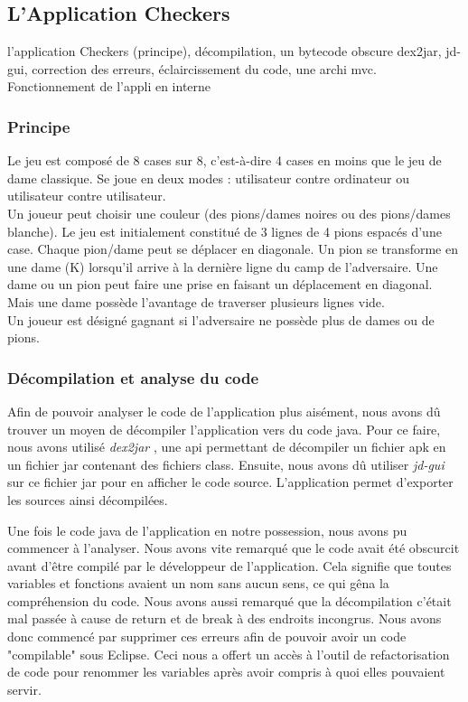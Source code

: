 
\subsection{L'Application Checkers}

l'application Checkers (principe), décompilation, un bytecode obscure
dex2jar, jd-gui, correction des erreurs, éclaircissement du code, une archi mvc.
Fonctionnement de l'appli en interne
\subsubsection{Principe}
\begin{figure}[hp]
	      \begin{center}
	      \end{center}
\end{figure}
Le jeu est composé de 8 cases sur 8, c’est-à-dire 4 cases en moins que le jeu de dame classique.  Se joue en deux modes : utilisateur contre ordinateur ou utilisateur contre utilisateur.\\
Un joueur peut choisir une couleur (des pions/dames noires ou des pions/dames blanche).  Le jeu est initialement constitué de 3 lignes de 4 pions espacés d’une case. Chaque pion/dame peut se déplacer en diagonale. 
Un pion se transforme en une dame (K) lorsqu’il arrive à la dernière ligne du camp de l’adversaire. Une dame ou un pion peut faire une prise en faisant un déplacement en diagonal. Mais une dame possède l’avantage de traverser plusieurs lignes vide.\\
Un joueur est désigné gagnant si l’adversaire ne possède plus de dames ou de pions.

\subsubsection{Décompilation et analyse du code}

Afin de pouvoir analyser le code de l'application plus aisément, nous avons dû trouver un moyen de décompiler l'application vers du code java.
Pour ce faire, nous avons utilisé \textit{dex2jar} \cite{dex2jar},
une api permettant de décompiler un fichier apk en un fichier jar contenant des fichiers class.
Ensuite, nous avons dû utiliser \textit{jd-gui} \cite{jdgui} sur ce fichier jar pour en afficher le code source.
L'application permet d'exporter les sources ainsi décompilées.

Une fois le code java de l'application en notre possession, nous avons pu commencer à l'analyser.
Nous avons vite remarqué que le code avait été obscurcit avant d'être compilé par le développeur de l'application.
Cela signifie que toutes variables et fonctions avaient un nom sans aucun sens, ce qui gêna la compréhension du code.
Nous avons aussi remarqué que la décompilation c'était mal passée à cause de return et de break à des endroits incongrus.
Nous avons donc commencé par supprimer ces erreurs afin de pouvoir avoir un code "compilable" sous Eclipse.
Ceci nous a offert un accès à l'outil de refactorisation de code pour renommer les variables après avoir compris à quoi elles pouvaient servir.

